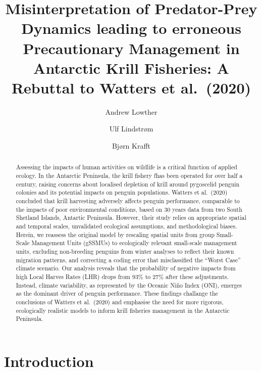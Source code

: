 \documentclass[]{elsarticle} %
\begin{document}
\begin{frontmatter}

  \title{Misinterpretation of Predator-Prey Dynamics leading to
erroneous Precautionary Management in Antarctic Krill Fisheries: A
Rebuttal to Watters et al.~(2020)}
    \author[1]{Andrew Lowther%
  }
  
    \author[2]{Ulf Lindstrøm%
  }
  
    \author[3]{Bjørn Krafft%
  }
  
  
  \begin{abstract}
  Assessing the impacts of human activities on wildlife is a critical
  function of applied ecology. In the Antarctic Peninsula, the krill
  fishery fhas been operated for over half a century, raising concerns
  about localised depletion of krill around pygoscelid penguin colonies
  and its potential impacts on penguin populations. Watters et
  al.~(2020) concluded that krill harvesting adversely affects penguin
  performance, comparable to the impacts of poor environmental
  conditions, based on 30 years data from two South Shetland Islands,
  Antartic Peninsula. However, their study relies on appropriate spatial
  and temporal scales, unvalidated ecological assumptions, and
  methodological biases. Herein, we reassess the original model by
  rescaling spatial units from group Small-Scale Management Units
  (gSSMUs) to ecologically relevant small-scale management units,
  excluding non-breeding penguins from winter analyses to reflect their
  known migration patterns, and correcting a coding error that
  misclassified the ``Worst Case'' climate scenario. Our analysis
  reveals that the probability of negative impacts from high Local
  Harves Rates (LHR) drops from 93\% to 27\% after these adjustments.
  Instead, climate variability, as represented by the Oceanic Niño Index
  (ONI), emerges as the dominant driver of penguin performance. These
  findings challange the conclusions of Watters et al.~(2020) and
  emphasise the need for more rigorous, ecologically realistic models to
  inform krill fisheries management in the Antarctic Peninsula.
  \end{abstract}
  
 \end{frontmatter}

\section{Introduction}\label{introduction}
\end{document}
